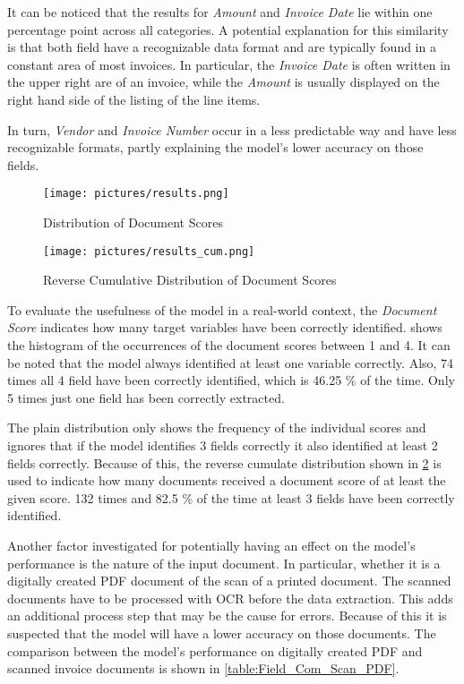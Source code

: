 It can be noticed that the results for \textit{Amount} and \textit{Invoice Date} lie within one percentage point across all categories. A potential explanation for this similarity is that both field have a recognizable data format and are typically found in a constant area of most invoices. In particular, the \textit{Invoice Date} is often written in the upper right are of an invoice, while the \textit{Amount} is usually displayed on the right hand side of the listing of the line items.

In turn, \textit{Vendor} and \textit{Invoice Number} occur in a less predictable way and have less recognizable formats, partly explaining the model's lower accuracy on those fields. 

\begin{figure}[!ht]
    \centering 
    \texttt{[image: pictures/results.png]}
    \caption{Distribution of Document Scores}
    \label{pic:results_1}    %
\end{figure}
\begin{figure}[!ht]
    \centering 
    \texttt{[image: pictures/results\_cum.png]}
    \caption{Reverse Cumulative Distribution of Document Scores}
    \label{pic:results_1_cum}    %
\end{figure}

To evaluate the usefulness of the model in a real-world context, the \textit{Document Score} indicates how many target variables have been correctly identified.  shows the histogram of the occurrences of the document scores between 1 and 4. It can be noted that the model always identified at least one variable correctly. Also, 74 times all 4 field have been correctly identified, which is 46.25 \% of the time. Only 5 times just one field has been correctly extracted.

The plain distribution only shows the frequency of the individual scores and ignores that if the model identifies 3 fields correctly it also identified at least 2 fields correctly. Because of this, the reverse cumulate distribution shown in \cref{pic:results_1_cum} is used to indicate how many documents received a document score of at least the given score. 132 times and 82.5 \% of the time at least 3 fields have been correctly identified.

Another factor investigated for potentially having an effect on the model's performance is the nature of the input document. In particular, whether it is a digitally created PDF document of the scan of a printed document. The scanned documents have to be processed with \ac{OCR} before the data extraction. This adds an additional process step that may be the cause for errors. Because of this it is suspected that the model will have a lower accuracy on those documents. The comparison between the model's performance on digitally created PDF and scanned invoice documents is shown in \cref{table:Field_Com_Scan_PDF}.

